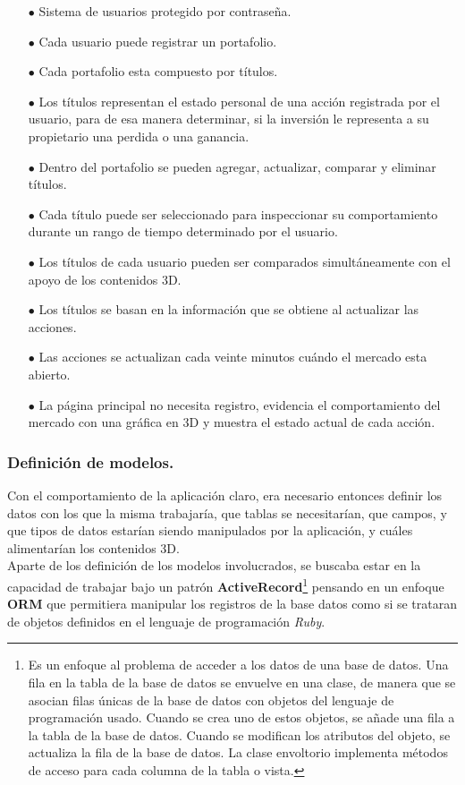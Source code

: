 \documentclass[twocolumn]{article}
\begin{document}
\begin{itemize}
\item[$\bullet$] Sistema de usuarios protegido por contraseña.
\item[$\bullet$] Cada usuario puede registrar un portafolio.
\item[$\bullet$] Cada portafolio esta compuesto por títulos.
\item[$\bullet$] Los títulos representan el estado personal de una acción registrada por el usuario, para de esa manera determinar, si la inversión le representa a su propietario una perdida o una ganancia.
\item[$\bullet$] Dentro del portafolio se pueden agregar, actualizar, comparar y eliminar títulos.
\item[$\bullet$] Cada título puede ser seleccionado para inspeccionar su comportamiento durante un rango de tiempo determinado por el usuario.
\item[$\bullet$] Los títulos de cada usuario pueden ser comparados simultáneamente con el apoyo de los contenidos 3D.
\item[$\bullet$] Los títulos se basan en la información que se obtiene al actualizar las acciones.
\item[$\bullet$] Las acciones se actualizan cada veinte minutos cuándo el mercado esta abierto.
\item[$\bullet$] La página principal no necesita registro, evidencia el comportamiento del mercado con una gráfica en 3D y muestra el estado actual de cada acción.
\end{itemize}

\subsubsection{Definición de modelos.}
\vspace{5 mm}

Con el comportamiento de la aplicación claro, era necesario entonces definir los datos con los que la misma trabajaría, que tablas se necesitarían, que campos, y que tipos de datos estarían siendo manipulados por la aplicación, y cuáles  alimentarían los contenidos 3D.\\

Aparte de los definición de los modelos involucrados, se buscaba estar en la capacidad de trabajar bajo un patrón \textbf{ActiveRecord}\footnote{Es un enfoque al problema de acceder a los datos de una base de datos. Una fila en la tabla de la base de datos se envuelve en una clase, de manera que se asocian filas únicas de la base de datos con objetos del lenguaje de programación usado. Cuando se crea uno de estos objetos, se añade una fila a la tabla de la base de datos. Cuando se modifican los atributos del objeto, se actualiza la fila de la base de datos. La clase envoltorio implementa métodos de acceso para cada columna de la tabla o vista.} pensando en un enfoque \textbf{ORM} que permitiera manipular los registros de la base datos como si se trataran de objetos definidos en el lenguaje de programación \emph{Ruby}.\\
\end{document}
